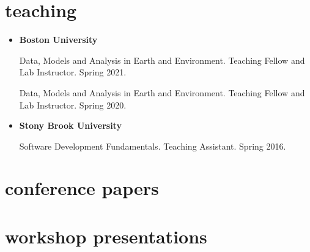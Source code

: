 \documentclass[10pt,oneside]{article}
\begin{document}

\section{teaching}

\mbox{}\vspace{-\dimexpr\baselineskip\relax}


\begin{itemize}[label={}]

  \item \textbf{Boston University}

        Data, Models and Analysis in Earth and Environment. Teaching Fellow and Lab Instructor. Spring 2021.

        Data, Models and Analysis in Earth and Environment. Teaching Fellow and Lab Instructor. Spring 2020.


  \item \textbf{Stony Brook University}

        Software Development Fundamentals. Teaching Assistant. Spring 2016.


\end{itemize}

\section{conference papers}

\mbox{}\vspace{-\dimexpr\baselineskip\relax}
\vspace*{-1em}
\printbibliography[type=inproceedings, heading=none]


\section{workshop presentations}

\mbox{}\vspace{-\dimexpr\baselineskip\relax}
\end{document}
